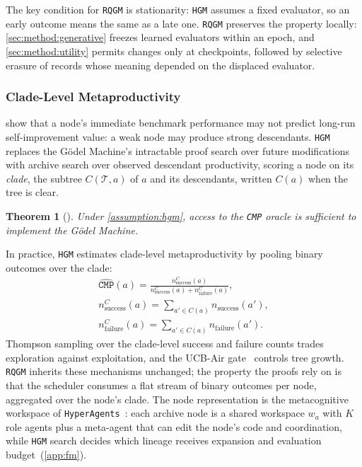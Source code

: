 \documentclass{paper}
\newtheorem{theorem}{Theorem}
\newcommand{\ourmethod}{\texttt{RQGM}\xspace}
\newcommand{\hgm}{\texttt{HGM}\xspace}
\newcommand{\hyperagents}{\texttt{HyperAgents}\xspace}
\newcommand{\cmp}{\texttt{CMP}\xspace}
\begin{document}
The key condition for \ourmethod is stationarity: \hgm assumes a fixed evaluator, so an early outcome means the same as a late one. \ourmethod preserves the property locally: \cref{sec:method:generative} freezes learned evaluators within an epoch, and \cref{sec:method:utility} permits changes only at checkpoints, followed by selective erasure of records whose meaning depended on the displaced evaluator.

\subsubsection{Clade-Level Metaproductivity}
\label{sec:prelim:cmp}

\citet{wang2025huxley} show that a node's immediate benchmark performance may not predict long-run self-improvement value: a weak node may produce strong descendants. \hgm replaces the G\"odel Machine's intractable proof search over future modifications with archive search over observed descendant productivity, scoring a node on its \emph{clade}, the subtree $C(\mathcal{T},a)$ of $a$ and its descendants, written $C(a)$ when the tree is clear.

\begin{theorem}[\citet{wang2025huxley}]
\label{thm:cmp}
Under \cref{assumption:hgm}, access to the \cmp oracle is sufficient to implement the G\"odel Machine.
\end{theorem}

In practice, \hgm estimates clade-level metaproductivity by pooling binary outcomes over the clade:
\[
\begin{gathered}
\widehat{\cmp}(a)=\frac{n_{\mathrm{success}}^C(a)}{n_{\mathrm{success}}^C(a)+n_{\mathrm{failure}}^C(a)},\\
n_{\mathrm{success}}^C(a)=\textstyle\sum_{a'\in C(a)} n_{\mathrm{success}}(a'),\\
n_{\mathrm{failure}}^C(a)=\textstyle\sum_{a'\in C(a)} n_{\mathrm{failure}}(a').
\end{gathered}
\]
Thompson sampling over the clade-level success and failure counts trades exploration against exploitation, and the UCB-Air gate~\citep{NIPS200849ae49a2} controls tree growth. \ourmethod inherits these mechanisms unchanged; the property the proofs rely on is that the scheduler consumes a flat stream of binary outcomes per node, aggregated over the node's clade. The node representation is the metacognitive workspace of \hyperagents~\citep{zhang2026hyperagents}: each archive node is a shared workspace $w_a$ with $K$ role agents plus a meta-agent that can edit the node's code and coordination, while \hgm search decides which lineage receives expansion and evaluation budget~(\cref{app:fm}).
\end{document}
